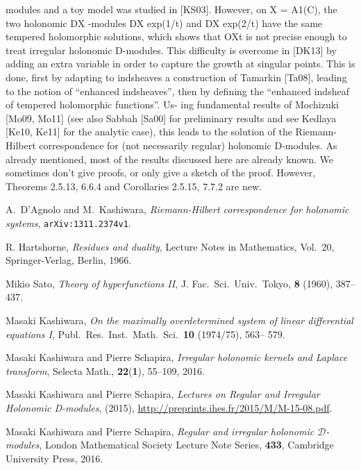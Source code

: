 \documentclass[12pt,a4paper]{jsarticle}
\theoremstyle{plain}
\theoremstyle{definition}
\theoremstyle{remark}
\numberwithin{equation}{section}
\begin{document}
modules and a toy model was studied in [KS03]. However, on X = A1(C), the two holonomic DX -modules DX exp(1/t) and DX exp(2/t) have the same tempered holomorphic solutions, which shows that OXt is not precise enough to treat irregular holonomic D-modules. This difficulty is overcome in [DK13] by adding an extra variable in order to capture the growth at singular points. This is done, first by adapting to indsheaves a construction of Tamarkin [Ta08], leading to the notion of “enhanced indsheaves”, then by defining the “enhanced indsheaf of tempered holomorphic functions”. Us- ing fundamental results of Mochizuki [Mo09, Mo11] (see also Sabbah [Sa00] for preliminary results and see Kedlaya [Ke10, Ke11] for the analytic case), this leads to the solution of the Riemann-Hilbert correspondence for (not necessarily regular) holonomic D-modules.
As already mentioned, most of the results discussed here are already known. We sometimes don’t give proofs, or only give a sketch of the proof. However, Theorems 2.5.13, 6.6.4 and Corollaries 2.5.15, 7.7.2 are new.


\begin{thebibliography}{20}
    \par
    A.\ D’Agnolo and M.\ Kashiwara, 
    \textit{Riemann-Hilbert correspondence for holonomic systems}, 
    \texttt{arXiv:1311.2374v1}.

     R. Hartshorne, 
    \textit{Residues and duality}, Lecture Notes in Mathematics, 
    Vol.\ 20, Springer-Verlag, Berlin, 1966.

     Mikio Sato, \textit{Theory of hyperfunctions II}, J. Fac.\ Sci.\ Univ.\ Tokyo, {\bf{8}} (1960), 387--437.

     Masaki Kashiwara, 
    \textit{On the maximally overdetermined system 
    of linear differential equations I}, Publ.\ Res.\ Inst.\ Math.\ Sci.\ \textbf{10} (1974/75), 563– 579.

     Masaki Kashiwara and Pierre Schapira, 
    \textit{Irregular holonomic kernels 
    and Laplace transform}, Selecta Math., \textbf{22}(\textbf{1}), 
    55–109, 2016.

     Masaki Kashiwara and Pierre Schapira, \textit{Lectures on Regular and Irregular Holonomic D-modules},
    (2015), \url{http://preprints.ihes.fr/2015/M/M-15-08.pdf}.
    
     Masaki Kashiwara and Pierre Schapira, 
    \emph{Regular and irregular holonomic $\mathcal{D}$-modules}, 
    London Mathematical Society Lecture Note Series, \textbf{433}, 
    Cambridge University Press, 2016.

    \end{thebibliography}
\end{document}
